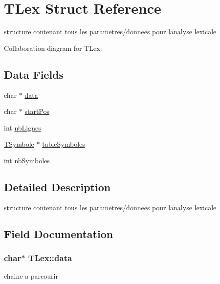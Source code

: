 \hypertarget{structTLex}{}\section{T\+Lex Struct Reference}
\label{structTLex}


structure contenant tous les parametres/donnees pour l\textquotesingle{}analyse lexicale  




Collaboration diagram for T\+Lex\+:
\subsection*{Data Fields}
\begin{DoxyCompactItemize}
\item 
char $\ast$ \hyperlink{structTLex_a2242e630c3f871659c3e36b101b504b4}{data}
\item 
char $\ast$ \hyperlink{structTLex_a1122e1ced17c2c07f7975b4f11110ad8}{start\+Pos}
\item 
int \hyperlink{structTLex_a74499b75b25dc1bce1fb2f66af6ce1e2}{nb\+Lignes}
\item 
\hyperlink{structTSymbole}{T\+Symbole} $\ast$ \hyperlink{structTLex_a31a6c4fc0839643e3251a372ba7adf04}{table\+Symboles}
\item 
int \hyperlink{structTLex_a84d0d3a30f4b42f8db675f8cbb60373f}{nb\+Symboles}
\end{DoxyCompactItemize}


\subsection{Detailed Description}
structure contenant tous les parametres/donnees pour l\textquotesingle{}analyse lexicale 

\subsection{Field Documentation}
\subsubsection[{\texorpdfstring{data}{data}}]{\setlength{\rightskip}{0pt plus 5cm}char$\ast$ T\+Lex\+::data}\hypertarget{structTLex_a2242e630c3f871659c3e36b101b504b4}{}\label{structTLex_a2242e630c3f871659c3e36b101b504b4}
chaine a parcourir 
